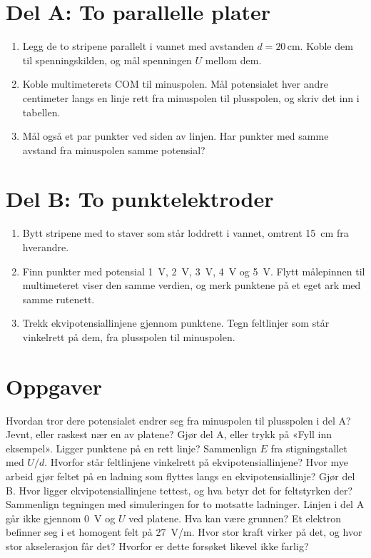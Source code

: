 \documentclass[11pt]{article}
\begin{document}
\section*{Del A: To parallelle plater}

\begin{enumerate}
\item Legg de to stripene parallelt i vannet med avstanden $d = 20\,\mathrm{cm}$. Koble dem til spenningskilden, og mål spenningen $U$ mellom dem.
\item Koble multimeterets COM til minuspolen. Mål potensialet hver andre centimeter langs en linje rett fra minuspolen til plusspolen, og skriv det inn i tabellen.
\item Mål også et par punkter ved siden av linjen. Har punkter med samme avstand fra minuspolen samme potensial?
\end{enumerate}

\section*{Del B: To punktelektroder}

\begin{enumerate}
\item Bytt stripene med to staver som står loddrett i vannet, omtrent 15~cm fra hverandre.
\item Finn punkter med potensial 1~V, 2~V, 3~V, 4~V og 5~V. Flytt målepinnen til multimeteret viser den samme verdien, og merk punktene på et eget ark med samme rutenett.
\item Trekk ekvipotensiallinjene gjennom punktene. Tegn feltlinjer som står vinkelrett på dem, fra plusspolen til minuspolen.
\end{enumerate}

\section*{Oppgaver}

\begin{oppgaveliste}
\oppgave {}Hvordan tror dere potensialet endrer seg fra minuspolen til plusspolen i del A? Jevnt, eller raskest nær en av platene?
\svar
\oppgave {}Gjør del A, eller trykk på «Fyll inn eksempel». Ligger punktene på en rett linje? Sammenlign $E$ fra stigningstallet med $U/d$.
\svar
\oppgave {}Hvorfor står feltlinjene vinkelrett på ekvipotensiallinjene? Hvor mye arbeid gjør feltet på en ladning som flyttes langs en ekvipotensiallinje?
\svar
\oppgave {}Gjør del B. Hvor ligger ekvipotensiallinjene tettest, og hva betyr det for feltstyrken der? Sammenlign tegningen med simuleringen for to motsatte ladninger.
\svar
\oppgave {}Linjen i del A går ikke gjennom 0~V og $U$ ved platene. Hva kan være grunnen?
\svar
\oppgave {}Et elektron befinner seg i et homogent felt på 27~V/m. Hvor stor kraft virker på det, og hvor stor akselerasjon får det? Hvorfor er dette forsøket likevel ikke farlig?
\svar
\end{oppgaveliste}
\end{document}

